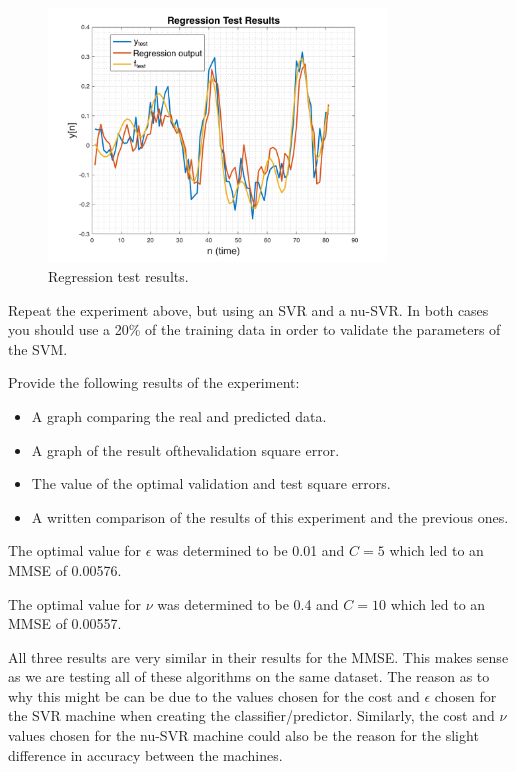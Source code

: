 \documentclass[11pt]{article}
\begin{document}
\begin{figure}[h!]
    \centering
    \includegraphics[width=0.8\textwidth]{figure_1.png}
    \vspace{-1em}\caption{Regression test results.}
\end{figure}

\newpage
Repeat the experiment above, but using an SVR and a nu-SVR. In both cases you should use a 20\% of the training data in order to validate the parameters of the SVM.

Provide the following results of the experiment:

\begin{itemize}
    \item A graph comparing the real and predicted data.
    \item A graph of the result ofthevalidation square error.
    \item The value of the optimal validation and test square errors.
    \item A written comparison of the results of this experiment and the previous ones.
\end{itemize}

\begin{tcolorbox}[colback=CrispBlue!5!white,colframe=CrispBlue!75!black,title=Repeating the experiment using SVR and nu-SVR.]
    The optimal value for \(\epsilon\) was determined to be 0.01 and \(C = 5\) which led to an MMSE of 0.00576.\vspace{1em}

    The optimal value for \(\nu\) was determined to be 0.4 and \(C = 10\) which led to an MMSE of 0.00557.\vspace{1em}

    All three results are very similar in their results for the MMSE. This makes sense as we are testing all of these algorithms on the same dataset. The reason as to why this might be can be due to the values chosen for the cost and \(\epsilon\) chosen for the SVR machine when creating the classifier/predictor. Similarly, the cost and \(\nu\) values chosen for the nu-SVR machine could also be the reason for the slight difference in accuracy between the machines.
\end{tcolorbox}
\end{document}

